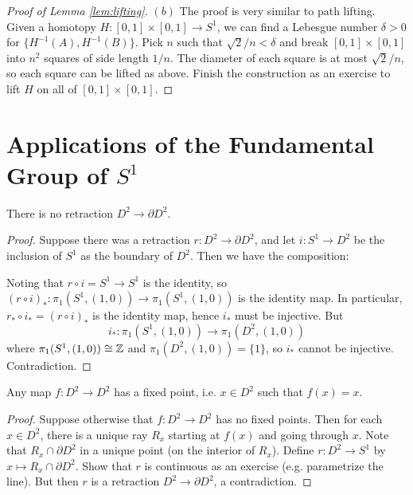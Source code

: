 \begin{proof}[Proof of Lemma \ref{lem:lifting}]
  $(b)$ The proof is very similar to path lifting.
  Given a homotopy $H : [0, 1] \times [0, 1] \to S^1$,
  we can find a Lebesgue number $\delta > 0$
  for $\{H^{-1}(A), H^{-1}(B)\}$. Pick $n$
  such that $\sqrt{2} / n < \delta$ and break
  $[0, 1] \times [0, 1]$ into $n^2$ squares
  of side length $1 / n$. The diameter of each
  square is at most $\sqrt{2} / n$, so each square
  can be lifted as above. Finish the construction
  as an exercise to lift $H$ on all of
  $[0, 1] \times [0, 1]$.
\end{proof}

\section{Applications of the Fundamental Group of \texorpdfstring{$S^1$}{S1}}

\begin{corollary}
  There is no retraction $D^2 \to \partial D^2$.
\end{corollary}

\begin{proof}
  Suppose there was a retraction $r : D^2 \to \partial D^2$,
  and let $i : S^1 \to D^2$ be the inclusion of $S^1$
  as the boundary of $D^2$. Then we have the composition:
  \begin{center}
  \end{center}
    Noting that $r \circ i = S^1 \to S^1$ is the
    identity, so $(r \circ i)_* : \pi_1(S^1, (1, 0)) \to \pi_1(S^1, (1, 0))$
    is the identity map. In particular,
    $r_* \circ i_* = (r \circ i)_*$ is the identity map,
    hence $i_*$ must be injective.
    But
    \[
      i_* : \pi_1(S^1, (1, 0)) \to \pi_1(D^2, (1, 0))
    \]
    where $\pi_1(S^1, (1, 0)) \cong \mathbb{Z}$ and
    $\pi_1(D^2, (1, 0)) = \{1\}$, so $i_*$ cannot be
    injective. Contradiction.
\end{proof}

\begin{corollary}
  Any map $f : D^2 \to D^2$ has a fixed point, i.e.
  $x \in D^2$ such that $f(x) = x$.
\end{corollary}

\begin{proof}
  Suppose otherwise that $f : D^2 \to D^2$ has no fixed
  points.
  Then for each $x \in D^2$, there is a unique ray
  $R_x$ starting at $f(x)$ and going through $x$.
  Note that $R_x \cap \partial D^2$ in a unique point
  (on the interior of $R_x$). Define
  $r : D^2 \to S^1$ by $x \mapsto R_x \cap \partial D^2$.
  Show that $r$ is continuous as an exercise (e.g.
  parametrize the line).
  But then $r$ is a retraction $D^2 \to \partial D^2$,
  a contradiction.
\end{proof}

